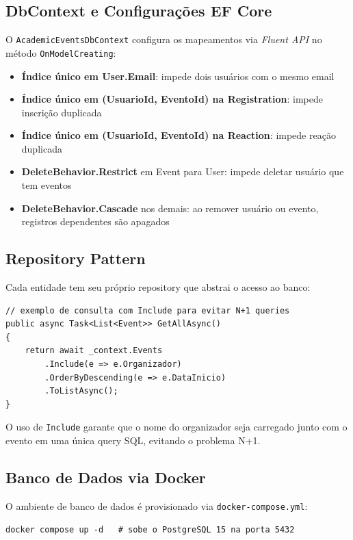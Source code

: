 \documentclass[11pt, a4paper, oneside]{article}
\begin{document}
\subsection{DbContext e Configurações EF Core}

O \texttt{AcademicEventsDbContext} configura os mapeamentos via \textit{Fluent API} no método \texttt{OnModelCreating}:

\begin{itemize}[noitemsep]
  \item \textbf{Índice único em User.Email}: impede dois usuários com o mesmo email
  \item \textbf{Índice único em (UsuarioId, EventoId) na Registration}: impede inscrição duplicada
  \item \textbf{Índice único em (UsuarioId, EventoId) na Reaction}: impede reação duplicada
  \item \textbf{DeleteBehavior.Restrict} em Event para User: impede deletar usuário que tem eventos
  \item \textbf{DeleteBehavior.Cascade} nos demais: ao remover usuário ou evento, registros dependentes são apagados
\end{itemize}

\subsection{Repository Pattern}

Cada entidade tem seu próprio repository que abstrai o acesso ao banco:

\begin{lstlisting}[language={[Sharp]C}]
// exemplo de consulta com Include para evitar N+1 queries
public async Task<List<Event>> GetAllAsync()
{
    return await _context.Events
        .Include(e => e.Organizador)
        .OrderByDescending(e => e.DataInicio)
        .ToListAsync();
}
\end{lstlisting}

O uso de \texttt{Include} garante que o nome do organizador seja carregado junto com o evento em uma única query SQL, evitando o problema N+1.

\subsection{Banco de Dados via Docker}

O ambiente de banco de dados é provisionado via \texttt{docker-compose.yml}:

\begin{lstlisting}
docker compose up -d   # sobe o PostgreSQL 15 na porta 5432
\end{lstlisting}
\end{document}
